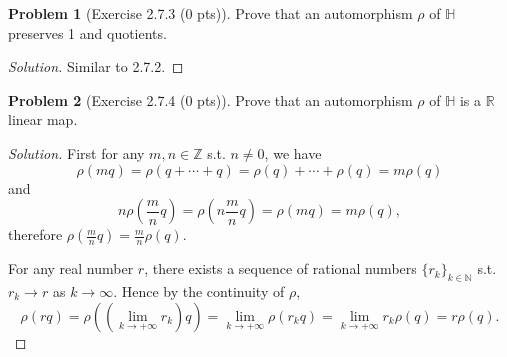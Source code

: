 \documentclass{article}
\theoremstyle{definition}
\newtheorem{problem}{Problem}
\theoremstyle{plain}
\begin{document}
\begin{problem}[Exercise 2.7.3 (0 pts)]Prove that an automorphism $\rho$ of $\mathbb{H}$ preserves 1 and quotients.
\end{problem}
\begin{adjustwidth}{0.7cm}{}
\color{blue}
\begin{proof}[Solution]Similar to 2.7.2.
\color{black}
\end{proof}
\end{adjustwidth}

\begin{problem}[Exercise 2.7.4 (0 pts)]Prove that an automorphism $\rho$ of $\mathbb{H}$ is a $\mathbb{R}$ linear map.
\end{problem}
\begin{adjustwidth}{0.7cm}{}
\color{blue}
\begin{proof}[Solution]First for any $m,n\in\mathbb{Z}$ s.t. $n\neq0$, we have
\begin{displaymath}
\rho(mq)=\rho(q+\cdots+q)=\rho(q)+\cdots+\rho(q)=m\rho(q)
\end{displaymath}
and
\begin{displaymath}
n\rho\left(\frac{m}{n}q\right)=\rho\left(n\frac{m}{n}q\right)=\rho\left(mq\right)=m\rho(q),
\end{displaymath}
therefore $\rho\left(\frac{m}{n}q\right)=\frac{m}{n}\rho(q)$.\par
For any real number $r$, there exists a sequence of rational numbers $\{r_k\}_{k\in\mathbb{N}}$ s.t. $r_k\to r$ as $k\to\infty$. Hence by the continuity of $\rho$,
\begin{displaymath}
\rho(rq)=\rho\left(\left(\lim_{k\to+\infty}r_k\right)q\right)=\lim_{k\to+\infty}\rho(r_kq)=\lim_{k\to+\infty}r_k\rho(q)=r\rho(q).
\end{displaymath}
\color{black}
\end{proof}
\end{adjustwidth}
\end{document}
